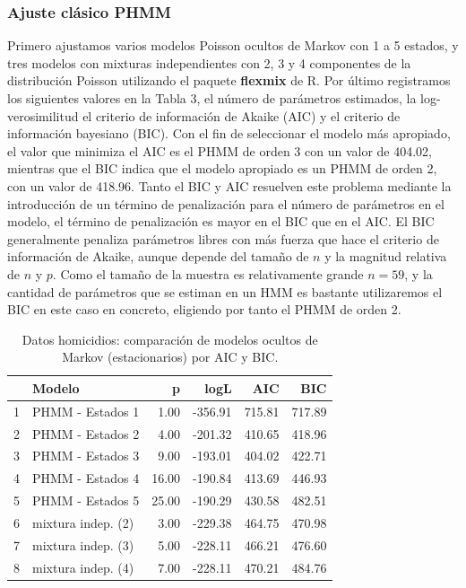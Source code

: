 \documentclass[a4paper]{article}\usepackage[]{graphicx}\usepackage[]{color}
\begin{document}
\subsubsection*{Ajuste clásico PHMM}






Primero ajustamos varios modelos Poisson ocultos de Markov con 1 a 5 estados, y tres modelos con mixturas independientes con 2, 3 y 4 componentes de la distribución Poisson utilizando el paquete \textbf{flexmix} de R. Por último registramos los siguientes valores en la Tabla 3, el número de parámetros estimados, la log-verosimilitud el criterio de información de Akaike (AIC) y el criterio de información bayesiano (BIC). Con el fin de seleccionar el modelo más apropiado, el valor que minimiza el AIC es el PHMM de orden 3 con un valor de 404.02, mientras que el BIC indica que el modelo apropiado es un PHMM de orden 2, con un valor de 418.96. Tanto el BIC y AIC resuelven este problema mediante la introducción de un término de penalización para el número de parámetros en el modelo, el término de penalización es mayor en el BIC que en el AIC. El BIC generalmente penaliza parámetros libres con más fuerza que hace el criterio de información de Akaike, aunque depende del tamaño de $n$ y la magnitud relativa de $n$ y $p$. Como el tamaño de la muestra es relativamente grande $n = 59$, y la cantidad de parámetros que se estiman en un HMM es bastante utilizaremos el BIC en este caso en concreto, eligiendo por tanto el PHMM de orden 2.

\begin{table}[ht]
\centering
\begin{tabular}{rlrrrr}
  \hline
 & Modelo & p & logL & AIC & BIC \\ 
  \hline
1 & PHMM - Estados 1 & 1.00 & -356.91 & 715.81 & 717.89 \\ 
  2 & PHMM - Estados 2 & 4.00 & -201.32 & 410.65 & 418.96 \\ 
  3 & PHMM - Estados 3 & 9.00 & -193.01 & 404.02 & 422.71 \\ 
  4 & PHMM - Estados 4 & 16.00 & -190.84 & 413.69 & 446.93 \\ 
  5 & PHMM - Estados 5 & 25.00 & -190.29 & 430.58 & 482.51 \\ 
  6 & mixtura indep. (2) & 3.00 & -229.38 & 464.75 & 470.98 \\ 
  7 & mixtura indep. (3) & 5.00 & -228.11 & 466.21 & 476.60 \\ 
  8 & mixtura indep. (4) & 7.00 & -228.11 & 470.21 & 484.76 \\ 
   \hline
\end{tabular}
\caption{Datos homicidios: comparación de modelos ocultos de Markov (estacionarios) por AIC y BIC.} 
\end{table}
\end{document}
